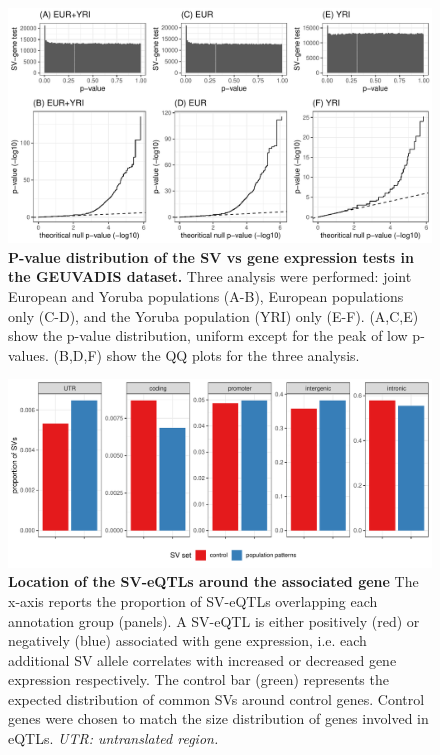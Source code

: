 \documentclass[11pt]{ucscthesis}
\begin{document}
\begin{figure}[p]
  \includegraphics[width=\linewidth]{fig-sv-eqtl.pdf}
  \caption[P-value distribution of the SV vs gene expression tests in the GEUVADIS dataset]{{\bf P-value distribution of the SV vs gene expression tests in the GEUVADIS dataset.}
    Three analysis were performed: joint European and Yoruba populations (A-B), European populations only (C-D), and the Yoruba population (YRI) only (E-F).
    (A,C,E) show the p-value distribution, uniform except for the peak of low p-values.
    (B,D,F) show the QQ plots for the three analysis.
  }
  \label{fig:eqtl_qc}
  \end{figure}

\begin{figure}[p]
  \includegraphics[width=\linewidth, page=2]{fig-sv-functional-summary.pdf}
  \caption[Location of the SV-eQTLs around the associated gene]{{\bf Location of the SV-eQTLs around the associated gene}
    The x-axis reports the proportion of SV-eQTLs overlapping each annotation group (panels).
    A SV-eQTL is either positively (red) or negatively (blue) associated with gene expression, i.e. each additional SV allele correlates with increased or decreased gene expression respectively.
    The control bar (green) represents the expected distribution of common SVs around control genes.
    Control genes were chosen to match the size distribution of genes involved in eQTLs.
    {\it UTR: untranslated region.}
  }
  \label{fig:eqtl_enr}
\end{figure}
\end{document}
